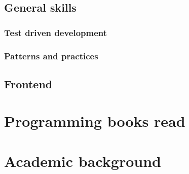 \documentclass[a5paper,oneside]{amsart}
\theoremstyle{definition}
\numberwithin{equation}{subsection}
\begin{document}
        \subsection{General skills}
            \subsubsection{Test driven development}
            \subsubsection{Patterns and practices}
            
        \subsection{Frontend}
        
    \newpage
    \section{Programming books read}

    \newpage    
    \section{Academic background}
                       
\end{document}
